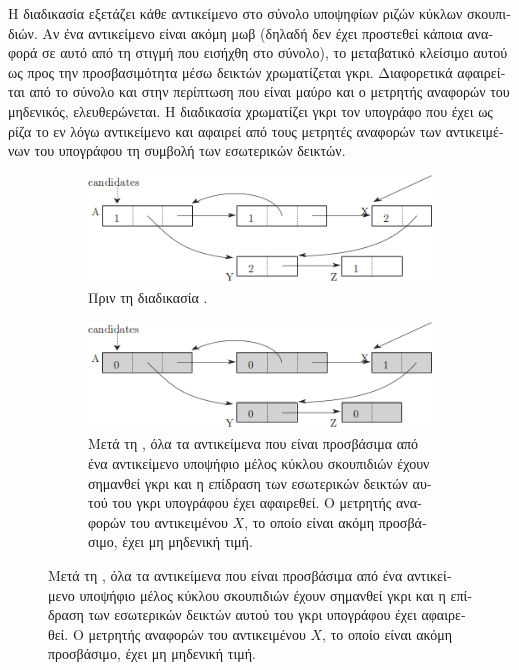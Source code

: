 \begin{greek}
Η διαδικασία  εξετάζει κάθε
αντικείμενο στο σύνολο υποψηφίων ριζών κύκλων σκουπιδιών.
Αν ένα αντικείμενο είναι ακόμη μωβ (δηλαδή δεν έχει προστεθεί
κάποια αναφορά σε αυτό από τη στιγμή που εισήχθη στο σύνολο),
το μεταβατικό κλείσιμο αυτού ως προς την προσβασιμότητα μέσω
δεικτών χρωματίζεται γκρι. Διαφορετικά αφαιρείται από το
σύνολο και στην περίπτωση που είναι μαύρο και ο μετρητής
αναφορών του μηδενικός, ελευθερώνεται. Η διαδικασία
 χρωματίζει γκρι τον υπογράφο που έχει ως
ρίζα το εν λόγω αντικείμενο και αφαιρεί από τους μετρητές
αναφορών των αντικειμένων του υπογράφου τη συμβολή των
εσωτερικών δεικτών.

\begin{figure}[H]
  \centering
  \begin{subfigure}{1.0\textwidth}
    \includegraphics{figures/refcnt_2a}
    \caption{Πριν τη διαδικασία .}
  \end{subfigure}

  \begin{subfigure}[b]{1.0\textwidth}
    \includegraphics{figures/refcnt_2b}
    \caption
      {Μετά τη , όλα τα αντικείμενα που
       είναι προσβάσιμα από ένα αντικείμενο υποψήφιο μέλος
       κύκλου σκουπιδιών έχουν σημανθεί γκρι και η επίδραση
       των εσωτερικών δεικτών αυτού του γκρι υπογράφου έχει
       αφαιρεθεί. Ο μετρητής αναφορών του αντικειμένου $X$,
       το οποίο είναι ακόμη προσβάσιμο, έχει μη μηδενική
       τιμή.}
  \end{subfigure}
  

\end{figure}
\end{greek}

